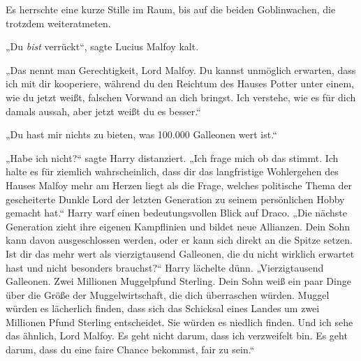 Es herrschte eine kurze Stille im Raum, bis auf die beiden Goblinwachen, die trotzdem weiteratmeten.

„Du \emph{bist} verrückt“, sagte Lucius Malfoy kalt.

„Das nennt man Gerechtigkeit, Lord Malfoy. Du kannst unmöglich erwarten, dass ich mit dir kooperiere, während du den Reichtum des Hauses Potter unter einem, wie du jetzt weißt, falschen Vorwand an dich bringst. Ich verstehe, wie es für dich damals aussah, aber jetzt weißt du es besser.“

„Du hast mir nichts zu bieten, was 100.000 Galleonen wert ist.“

„Habe ich nicht?“ sagte Harry distanziert. „Ich frage mich ob das stimmt. Ich halte es für ziemlich wahrscheinlich, dass dir das langfristige Wohlergehen des Hauses Malfoy mehr am Herzen liegt als die Frage, welches politische Thema der gescheiterte Dunkle Lord der letzten Generation zu seinem persönlichen Hobby gemacht hat.“
Harry warf einen bedeutungsvollen Blick auf Draco.
„Die nächste Generation zieht ihre eigenen Kampflinien und bildet neue Allianzen. Dein Sohn kann davon ausgeschlossen werden, oder er kann sich direkt an die Spitze setzen. Ist dir das mehr wert als vierzigtausend Galleonen, die du nicht wirklich erwartet hast und nicht besonders brauchst?“ Harry lächelte dünn. „Vierzigtausend Galleonen. Zwei Millionen Muggelpfund Sterling. Dein Sohn weiß ein paar Dinge über die Größe der Muggelwirtschaft, die dich überraschen würden. Muggel würden es lächerlich finden, dass sich das Schicksal eines Landes um zwei Millionen Pfund Sterling entscheidet. Sie würden es niedlich finden. Und ich sehe das ähnlich, Lord Malfoy. Es geht nicht darum, dass ich verzweifelt bin. Es geht darum, dass du eine faire Chance bekommst, fair zu sein.“

